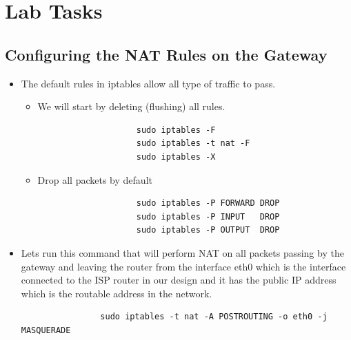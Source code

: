 \section{Lab Tasks}

\subsection{Configuring the NAT Rules on the Gateway}
\begin{itemize}
	\item The default rules in iptables allow all type of traffic to pass.

		\begin{itemize}
			\item We will start by deleting (flushing) all rules.
			\begin{verbatim}
					sudo iptables -F
					sudo iptables -t nat -F
					sudo iptables -X
			\end{verbatim}

			\item Drop all packets by default
			\begin{verbatim}
					sudo iptables -P FORWARD DROP
					sudo iptables -P INPUT   DROP
					sudo iptables -P OUTPUT  DROP
			\end{verbatim}
		\end{itemize}

	\item Lets run this command that will perform NAT on all packets passing by the gateway and leaving the router from the interface eth0 which is the interface connected to the ISP router in our design and it has the public IP address which is the routable address in the network.
		\begin{verbatim}
				sudo iptables -t nat -A POSTROUTING -o eth0 -j MASQUERADE
		\end{verbatim}
\end{itemize}

